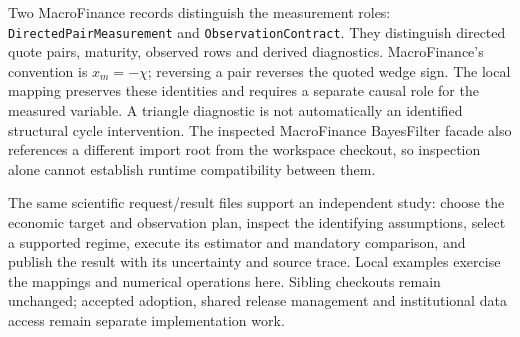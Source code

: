 Two MacroFinance records distinguish the measurement roles:
\texttt{DirectedPair\allowbreak Measurement} and
\texttt{Observation\allowbreak Contract}. They distinguish directed quote pairs, maturity,
observed rows and derived diagnostics. MacroFinance's convention is $x_m=-\chi$;
reversing a pair reverses the quoted wedge sign. The local mapping preserves
these identities and requires a separate causal role for the measured
variable. A triangle diagnostic is not automatically an identified structural
cycle intervention. The inspected MacroFinance BayesFilter facade also
references a different import root from the workspace checkout, so inspection
alone cannot establish runtime compatibility between them.

The same scientific request/result files support an independent study:
choose the economic target and observation plan, inspect the identifying
assumptions, select a supported regime, execute its estimator and mandatory
comparison, and publish the result with its uncertainty and source trace.
Local examples exercise the mappings and numerical operations here. Sibling
checkouts remain unchanged; accepted adoption, shared release management and
institutional data access remain separate implementation work.
